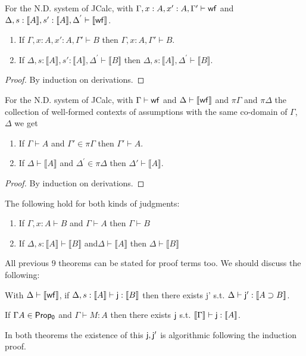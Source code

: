 \begin{theorem}[Contraction]
For the N.D. system of JCalc, with $\Gamma,x:A,x':A,\Gamma'\vdash \sf wf$ and $\Delta,s:\llbracket A \rrbracket, s':\llbracket A\rrbracket,\Delta^{'}\vdash\llbracket {\sf wf}\rrbracket $.
\begin{enumerate}
\item If  $\Gamma,x:A,x':A,\Gamma'\vdash  B$ then $\Gamma,x:A,\Gamma'\vdash   B$.
\item If  $\Delta,s:\llbracket A \rrbracket, s':\llbracket A\rrbracket,\Delta^{'}\vdash\llbracket B \rrbracket $ then $\Delta,s:\llbracket A \rrbracket, \Delta^{'} \vdash \llbracket   B\rrbracket$.
\end{enumerate}  
\end{theorem}
\begin{proof}
By induction on derivations.
\end{proof}
\begin{theorem}[Permutation]
For the N.D. system of JCalc, with $\Gamma\vdash \sf wf$ and $\Delta\vdash\llbracket {\sf wf}\rrbracket $ and $\pi \Gamma$ and $\pi \Delta$ the collection of well-formed contexts of assumptions with the same co-domain of $\Gamma$, $\Delta$ we get
\begin{enumerate}
\item If  $\Gamma\vdash   A$ and $\Gamma'\in \pi{\Gamma}$ then $\Gamma'\vdash   A$.
\item If  $\Delta\vdash \llbracket   A\rrbracket$ and $\Delta^{'}\in \pi \Delta$ then  $ \Delta'\vdash \llbracket   A\rrbracket$.
\end{enumerate}
\end{theorem}
\begin{proof}
By induction on derivations.
\end{proof}
\begin{theorem}
The following hold for both kinds of judgments:
\begin{enumerate}
\item If  $\Gamma,x:A\vdash B$ and $\Gamma\vdash  A$ then $\Gamma\vdash B$ 
\item If  $\Delta,s:\llbracket A \rrbracket \vdash \llbracket B\rrbracket$ and$\Delta\vdash  \llbracket A\rrbracket$ then  $\Delta\vdash\llbracket B\rrbracket$ 
\end{enumerate}
\end{theorem}
All previous $9$ theorems can be stated for proof terms too. We should discuss the following:
\begin{theorem}
	\label{deductterms}
	With $\Delta\vdash \llbracket\sf wf\rrbracket$, if $\Delta, s:\llbracket   A\rrbracket \vdash {\sf j}:\llbracket B \rrbracket $ then there exists {\sf j'} s.t. $\Delta \vdash {\sf j'}:\llbracket   A \supset B \rrbracket $. 
\end{theorem}
\begin{lemma}
\label{highorder}
	If $\Gamma A \in {\sf Prop_0}$ and $\Gamma\vdash M: A$ then there exists ${\sf j}$ s.t. $\llbracket \Gamma\rrbracket \vdash {\sf j}:\llbracket   A \rrbracket$. 
\end{lemma}
In both theorems the existence of this ${\sf j,j'}$ is algorithmic following the induction proof. 
